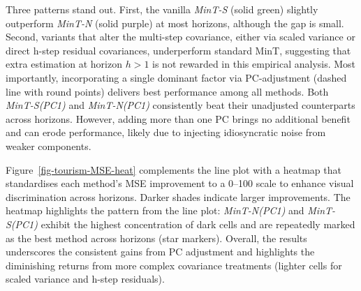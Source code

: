 \documentclass[
  11pt,
  letterpaper,
  DIV=11,
  numbers=noendperiod,
  titlepage]{scrartcl}
\begin{document}
Three patterns stand out. First, the vanilla \emph{MinT-S} (solid green)
slightly outperform \emph{MinT-N} (solid purple) at most horizons,
although the gap is small. Second, variants that alter the multi-step
covariance, either via scaled variance or direct h-step residual
covariances, underperform standard MinT, suggesting that extra
estimation at horizon \(h>1\) is not rewarded in this empirical
analysis. Most importantly, incorporating a single dominant factor via
PC-adjustment (dashed line with round points) delivers best performance
among all methods. Both \emph{MinT-S(PC1)} and \emph{MinT-N(PC1)}
consistently beat their unadjusted counterparts across horizons.
However, adding more than one PC brings no additional benefit and can
erode performance, likely due to injecting idiosyncratic noise from
weaker components.

Figure~\ref{fig-tourism-MSE-heat} complements the line plot with a
heatmap that standardises each method's MSE improvement to a 0--100
scale to enhance visual discrimination across horizons. Darker shades
indicate larger improvements. The heatmap highlights the pattern from
the line plot: \emph{MinT-N(PC1)} and \emph{MinT-S(PC1)} exhibit the
highest concentration of dark cells and are repeatedly marked as the
best method across horizons (star markers). Overall, the results
underscores the consistent gains from PC adjustment and highlights the
diminishing returns from more complex covariance treatments (lighter
cells for scaled variance and h-step residuals).
\end{document}

